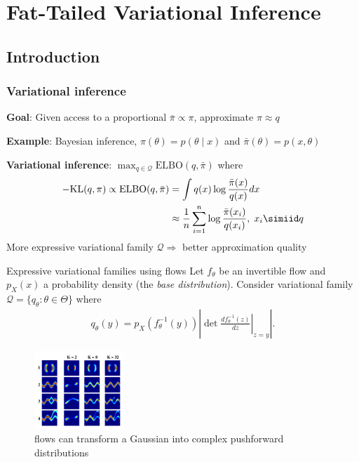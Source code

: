 \section{Fat-Tailed Variational Inference}

\subsection{Introduction}

\begin{frame}
    \frametitle{Variational inference}
    
    \textbf{Goal}: Given access to a proportional $\bar\pi \propto \pi$, approximate $\pi \approx q$
    
    \pause
    
    \textbf{Example}: Bayesian inference, $\pi(\theta) = p(\theta \mid x)$ and $\bar\pi(\theta) = p(x, \theta)$ 
    
    \pause
    
    \textbf{Variational inference}: $\max_{q \in \mathcal{Q}} \text{ELBO}(q, \bar\pi)$ where
    \begin{align*}
      -\text{KL}(q, \pi)
      \propto 
      \text{ELBO}(q,\bar\pi)
      &= \int q(x) \log \frac{\bar\pi(x)}{q(x)} dx\\
      & \approx \frac{1}{n} \sum_{i=1}^n \log \frac{\bar\pi(x_i)}{q(x_i)},\;
      x_i \simiid q
    \end{align*}
    \pause
    More expressive variational family $\mathcal{Q} \Rightarrow$ better approximation quality
\end{frame}

\begin{subframe}{Expressive variational families using flows}
    Let $f_\theta$ be an invertible flow and $p_X(x)$ a probability density (the \emph{base distribution}).
    Consider variational family $\mathcal{Q} = \{q_\theta : \theta \in \Theta\}$ where
    \begin{align}
        \label{eq:change-of-variable}
        q_\theta(y)
          = p_{X}(f_\theta^{-1}(y)) \left\lvert \det
            \left.\frac{d f_\theta^{-1}(z)}{dz} \right\vert_{z=y}
          \right\rvert .
    \end{align}
    
    \begin{figure}
        \centering
        \includegraphics[width=0.3\textwidth]{Figures/ftvi/norm_flow_eg.png}
        \caption{\parencite{rezende2015variational} flows can transform a Gaussian into complex pushforward distributions}
    \end{figure}
\end{subframe}

